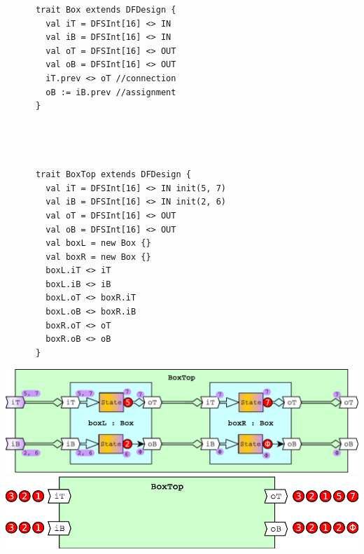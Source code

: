 
\begin{table}[t!]
  \centering
  \begin{minipage}[t][9cm][t]{0.34\linewidth}
    \centering
    \captionsetup{justification=centering}    
    \begin{verbatim}
      trait Box extends DFDesign {
        val iT = DFSInt[16] <> IN
        val iB = DFSInt[16] <> IN
        val oT = DFSInt[16] <> OUT
        val oB = DFSInt[16] <> OUT
        iT.prev <> oT //connection
        oB := iB.prev //assignment
      }
      
      
      
      
      trait BoxTop extends DFDesign {
        val iT = DFSInt[16] <> IN init(5, 7)
        val iB = DFSInt[16] <> IN init(2, 6)
        val oT = DFSInt[16] <> OUT
        val oB = DFSInt[16] <> OUT
        val boxL = new Box {}
        val boxR = new Box {}
        boxL.iT <> iT      
        boxL.iB <> iB
        boxL.oT <> boxR.iT 
        boxL.oB <> boxR.iB
        boxR.oT <> oT      
        boxR.oB <> oB
      }
    \end{verbatim}
    \vfill
    \label{fig:BoxTopCode}
  \end{minipage}%
  \hfill
  \begin{minipage}[t][9cm][b]{0.64\linewidth}
    \centering
    \captionsetup{justification=centering}
    \includegraphics[width=\linewidth]{graphics/connectivity.pdf}
    \vfill
    \label{fig:BoxTopDraw}
    \includegraphics[width=0.8\linewidth]{graphics/connectivityTokens.pdf}
    \label{fig:BoxTopTokens}
  \end{minipage}
\end{table}
